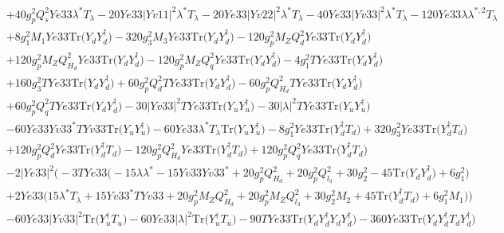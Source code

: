 \begin{align}
 &+40 g_{p}^{2} Q_{s}^{2} Ye33 \lambda^* T_{\lambda} -20 Ye33 |Yv11|^2 \lambda^* T_{\lambda} -20 Ye33 |Yv22|^2 \lambda^* T_{\lambda} -40 Ye33 |Yv33|^2 \lambda^* T_{\lambda} -120 Ye33 \lambda \lambda^{*,2} T_{\lambda} \nonumber \\ 
 &+8 g_{1}^{2} M_1 Ye33 \mbox{Tr}\Big({Y_d  Y_{d}^{\dagger}}\Big) -320 g_{3}^{2} M_3 Ye33 \mbox{Tr}\Big({Y_d  Y_{d}^{\dagger}}\Big) -120 g_{p}^{2} M_Z Q_{d}^{2} Ye33 \mbox{Tr}\Big({Y_d  Y_{d}^{\dagger}}\Big) \nonumber \\ 
 &+120 g_{p}^{2} M_Z Q_{H_d}^{2} Ye33 \mbox{Tr}\Big({Y_d  Y_{d}^{\dagger}}\Big) -120 g_{p}^{2} M_Z Q_{q}^{2} Ye33 \mbox{Tr}\Big({Y_d  Y_{d}^{\dagger}}\Big) -4 g_{1}^{2} TYe33 \mbox{Tr}\Big({Y_d  Y_{d}^{\dagger}}\Big) \nonumber \\ 
 &+160 g_{3}^{2} TYe33 \mbox{Tr}\Big({Y_d  Y_{d}^{\dagger}}\Big) +60 g_{p}^{2} Q_{d}^{2} TYe33 \mbox{Tr}\Big({Y_d  Y_{d}^{\dagger}}\Big) -60 g_{p}^{2} Q_{H_d}^{2} TYe33 \mbox{Tr}\Big({Y_d  Y_{d}^{\dagger}}\Big) \nonumber \\ 
 &+60 g_{p}^{2} Q_{q}^{2} TYe33 \mbox{Tr}\Big({Y_d  Y_{d}^{\dagger}}\Big) -30 |Yv33|^2 TYe33 \mbox{Tr}\Big({Y_u  Y_{u}^{\dagger}}\Big) -30 |\lambda|^2 TYe33 \mbox{Tr}\Big({Y_u  Y_{u}^{\dagger}}\Big) \nonumber \\ 
 &-60 Ye33 Yv33^* TYv33 \mbox{Tr}\Big({Y_u  Y_{u}^{\dagger}}\Big) -60 Ye33 \lambda^* T_{\lambda} \mbox{Tr}\Big({Y_u  Y_{u}^{\dagger}}\Big) -8 g_{1}^{2} Ye33 \mbox{Tr}\Big({Y_{d}^{\dagger}  T_d}\Big) +320 g_{3}^{2} Ye33 \mbox{Tr}\Big({Y_{d}^{\dagger}  T_d}\Big) \nonumber \\ 
 &+120 g_{p}^{2} Q_{d}^{2} Ye33 \mbox{Tr}\Big({Y_{d}^{\dagger}  T_d}\Big) -120 g_{p}^{2} Q_{H_d}^{2} Ye33 \mbox{Tr}\Big({Y_{d}^{\dagger}  T_d}\Big) +120 g_{p}^{2} Q_{q}^{2} Ye33 \mbox{Tr}\Big({Y_{d}^{\dagger}  T_d}\Big) \nonumber \\ 
 &-2 |Ye33|^2 \Big(-3 TYe33 \Big(-15 \lambda \lambda^*  -15 Yv33 Yv33^*  + 20 g_{p}^{2} Q_{H_d}^{2}  + 20 g_{p}^{2} Q_{l_3}^{2}  + 30 g_{2}^{2}  -45 \mbox{Tr}\Big({Y_d  Y_{d}^{\dagger}}\Big)  + 6 g_{1}^{2} \Big)\nonumber \\ 
 &+2 Ye33 \Big(15 \lambda^* T_{\lambda}  + 15 Yv33^* TYv33  + 20 g_{p}^{2} M_Z Q_{H_d}^{2}  + 20 g_{p}^{2} M_Z Q_{l_3}^{2}  + 30 g_{2}^{2} M_2  + 45 \mbox{Tr}\Big({Y_{d}^{\dagger}  T_d}\Big)  + 6 g_{1}^{2} M_1 \Big)\Big)\nonumber \\ 
 &-60 Ye33 |Yv33|^2 \mbox{Tr}\Big({Y_{u}^{\dagger}  T_u}\Big) -60 Ye33 |\lambda|^2 \mbox{Tr}\Big({Y_{u}^{\dagger}  T_u}\Big) -90 TYe33 \mbox{Tr}\Big({Y_d  Y_{d}^{\dagger}  Y_d  Y_{d}^{\dagger}}\Big) -360 Ye33 \mbox{Tr}\Big({Y_d  Y_{d}^{\dagger}  T_d  Y_{d}^{\dagger}}\Big) \nonumber \\ 

\end{align}
